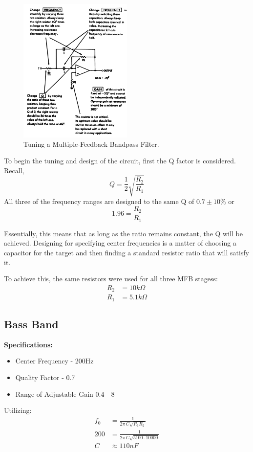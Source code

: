 \documentclass[12pt]{article}
\begin{document}
\begin{figure}[H]
	\centering
	\includegraphics[width=0.5\textwidth]{tuning}
	\caption{Tuning a Multiple-Feedback Bandpass Filter.}
	\label{fig:tuning}
\end{figure}
To begin the tuning and design of the circuit, first the Q factor is considered. Recall,
\[
	Q = \frac{1}{2}\sqrt{\frac{R_2}{R_1}}
\]
All three of the frequency ranges are designed to the same Q of $0.7 \pm 10\%$ or
\[
	1.96 = \frac{R_2}{R_1}
\]

Essentially, this means that as long as the ratio remains constant, the Q will be achieved.
Designing for specifying center frequencies is a matter of choosing a capacitor for the target and then finding a standard resistor ratio that will satisfy it.

To achieve this, the same resistors were used for all three MFB stagess:
\begin{align*}
	R_2 & = 10k\Omega  \\
	R_1 & = 5.1k\Omega
\end{align*}

\subsection{Bass Band}
\noindent \textbf{Specifications:}
\begin{itemize}
	\item Center Frequency - 200Hz
	\item Quality Factor - 0.7
	\item Range of Adjustable Gain 0.4 - 8
\end{itemize}
Utilizing:
\begin{align*}
	f_0 & = \frac{1}{2\pi\,C\sqrt{R_1R_2}}         \\
	200 & = \frac{1}{2\pi\,C\sqrt{5100\cdot10000}} \\
	C   & \approx 110nF                            \\
\end{align*}
\end{document}
